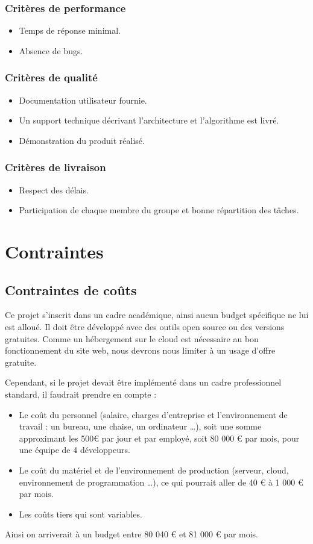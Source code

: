 \documentclass[a4paper,12pt]{report}
\begin{document}
\subsection{Critères de performance}
\begin{itemize}
\item Temps de réponse minimal.
\item Absence de bugs. 
\end{itemize}
\subsection{Critères de qualité}
\begin{itemize}
\item Documentation utilisateur fournie.
\item Un support technique décrivant l’architecture et l’algorithme est livré.
\item Démonstration du produit réalisé.
\end{itemize}
\subsection{Critères de livraison}
\begin{itemize}
\item Respect des délais.
\item Participation de chaque membre du groupe et bonne répartition des tâches.
\end{itemize}



\chapter{Contraintes}
\label{cont1}
\section{Contraintes de coûts}
Ce projet s'inscrit dans un cadre académique, ainsi aucun budget spécifique ne lui est alloué. Il doit être développé avec des outils open source ou des versions gratuites. Comme un hébergement sur le cloud est nécessaire au bon fonctionnement du site web, nous devrons nous limiter à un usage d’offre gratuite.

Cependant, si le projet devait être implémenté dans un cadre professionnel standard, il faudrait prendre en compte :
\begin{itemize}
    \item Le coût du personnel (salaire, charges d’entreprise et l’environnement de travail : un bureau, une chaise, un ordinateur …), soit une somme approximant les 500€  par jour et par employé, soit 80 000 € par mois, pour une équipe de 4 développeurs.
    \item Le coût du matériel et de l’environnement de production  (serveur, cloud, environnement de programmation …), ce qui pourrait aller de 40 €  à 1 000 € par mois.
    \item Les coûts tiers qui sont variables.
\end{itemize}
Ainsi on arriverait à un budget entre 80 040 € et 81 000 € par mois.
\end{document}
